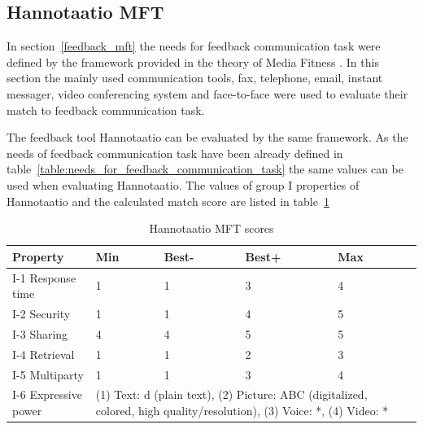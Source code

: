 \documentclass[english,12pt,a4paper,pdftex]{article}
\begin{document}

\subsection{Hannotaatio MFT}
\label{sec:hannotaatio_mft}

In section~\ref{feedback_mft} the needs for feedback communication task were defined by the framework provided in the theory of Media Fitness \citep{higa2007}. In this section the mainly used communication tools, fax, telephone, email, instant messager, video conferencing system and face-to-face were used to evaluate their match to feedback communication task.

The feedback tool Hannotaatio can be evaluated by the same framework. As the needs of feedback communication task have been already defined in table~\ref{table:needs_for_feedback_communication_task} the same values can be used when evaluating Hannotaatio. The values of group I properties of Hannotaatio and the calculated match score are listed in table~\ref{table:hannotaatio_mft_scores}

\begin{table}[!h]
\renewcommand{\arraystretch}{1.3}
\caption{Hannotaatio MFT scores}
\label{table:hannotaatio_mft_scores}
\centering
\begin{tabular}{|p{3cm}|p{2cm}|p{2cm}|p{2cm}|p{2cm}|p{2cm}|}
\hline
\textbf{Property} & \textbf{Min} & \textbf{Best-} & \textbf{Best+} & \textbf{Max}\\
\hline
I-1 Response time & 1 & 1 & 3 & 4 \\
\hline
I-2 Security & 1 & 1 & 4 & 5 \\
\hline
I-3 Sharing & 4 & 4 & 5 & 5 \\
\hline
I-4 Retrieval & 1 & 1 & 2 & 3 \\
\hline
I-5 Multiparty & 1 & 1 & 3 & 4 \\
\hline
I-6 Expressive power & \multicolumn{4}{|p{10cm}|}{(1) Text: d (plain text), (2) Picture: ABC (digitalized, colored, high quality/resolution), (3) Voice: *, (4) Video: * } \\
\hline
\end{tabular}
\end{table}
\end{document}
